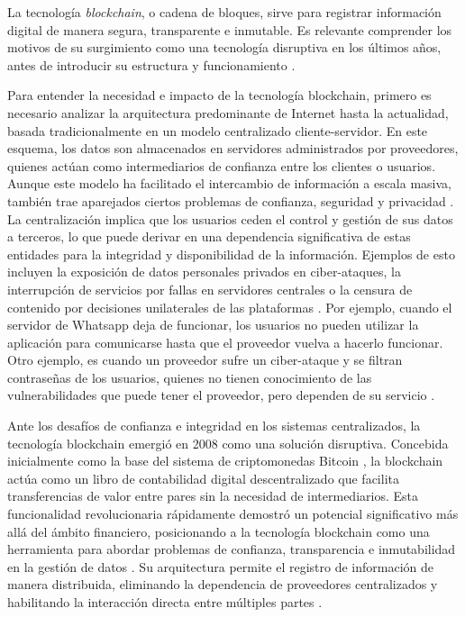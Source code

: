 La tecnología \textit{blockchain}, o cadena de bloques, sirve para registrar información digital de manera segura, transparente e inmutable. Es relevante comprender los motivos de su surgimiento como una tecnología disruptiva en los últimos años, antes de introducir su estructura y funcionamiento \cite{pending}.

Para entender la necesidad e impacto de la tecnología blockchain, primero es necesario analizar la arquitectura predominante de Internet hasta la actualidad, basada tradicionalmente en un modelo centralizado cliente-servidor. En este esquema, los datos son almacenados en servidores administrados por proveedores, quienes actúan como intermediarios de confianza entre los clientes o usuarios. Aunque este modelo ha facilitado el intercambio de información a escala masiva, también trae aparejados ciertos problemas de confianza, seguridad y privacidad \cite{gunawan2024review}. La centralización implica que los usuarios ceden el control y gestión de sus datos a terceros, lo que puede derivar en una dependencia significativa de estas entidades para la integridad y disponibilidad de la información. Ejemplos de esto incluyen la exposición de datos personales privados en ciber-ataques, la interrupción de servicios por fallas en servidores centrales o la censura de contenido por decisiones unilaterales de las plataformas \cite{gunawan2024review}. Por ejemplo, cuando el servidor de Whatsapp deja de funcionar, los usuarios no pueden utilizar la aplicación para comunicarse hasta que el proveedor vuelva a hacerlo funcionar. Otro ejemplo, es cuando un proveedor sufre un ciber-ataque y se filtran contraseñas de los usuarios, quienes no tienen conocimiento de las vulnerabilidades que puede tener el proveedor, pero dependen de su servicio \cite{pending}.

Ante los desafíos de confianza e integridad en los sistemas centralizados, la tecnología blockchain emergió en 2008 como una solución disruptiva. Concebida inicialmente como la base del sistema de criptomonedas Bitcoin \cite{satoshi2008bitcoin}, la blockchain actúa como un libro de contabilidad digital descentralizado que facilita transferencias de valor entre pares sin la necesidad de intermediarios. Esta funcionalidad revolucionaria rápidamente demostró un potencial significativo más allá del ámbito financiero, posicionando a la tecnología blockchain como una herramienta para abordar problemas de confianza, transparencia e inmutabilidad en la gestión de datos \cite{bulkowska2023implementation}. Su arquitectura permite el registro de información de manera distribuida, eliminando la dependencia de proveedores centralizados y habilitando la interacción directa entre múltiples partes \cite{bulkowska2023implementation}.

